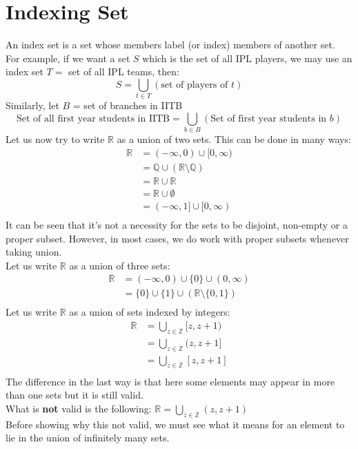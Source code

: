 \section{Indexing Set}\label{sec:indexset}
An index set is a set whose members label (or index) members of another set.\\
For example, if we want a set $S$ which is the set of all IPL players, we may use an index set $T=$ set of all IPL teams, then:
$$S = \bigcup_{t \in T}(\text{set of players of }t)$$
Similarly, let $B$ = set of branches in IITB
$$\text{Set of all first year students in IITB} = \bigcup_{b\in B}(\text{Set of first year students in }b)$$
Let us now try to write $\mathbb{R}$ as a union of two sets. This can be done in many ways:
\begin{align*}
    \mathbb{R} &= (-\infty, 0) \cup [0, \infty)\\
    &= \mathbb{Q} \cup (\mathbb{R}\setminus\mathbb{Q})\\
    &= \mathbb{R} \cup \mathbb{R}\\
    &= \mathbb{R} \cup \emptyset\\
    &= (-\infty, 1] \cup [0, \infty)\\
\end{align*}
It can be seen that it's not a necessity for the sets to be disjoint, non-empty or a proper subset. However, in most cases, we do work with proper subsets whenever taking union.\\
Let us write $\mathbb{R}$ as a union of three sets:
\begin{align*}
    \mathbb{R} &= (-\infty, 0) \cup \{0\} \cup (0, \infty)\\
    &= \{0\}\cup\{1\}\cup(\mathbb{R}\setminus\{0, 1\})\\
\end{align*}
Let us write $\mathbb{R}$ as a union of sets indexed by integers:
\begin{align*}
    \mathbb{R} &= \bigcup_{z\in\mathbb{Z}}[z, z+1)\\
    &= \bigcup_{z\in\mathbb{Z}}(z, z+1]\\
    &= \bigcup_{z\in\mathbb{Z}}[z, z+1]\\
\end{align*}
The difference in the last way is that here some elements may appear in more than one sets but it is still valid.\\
What is \textbf{not} valid is the following: $\mathbb{R} = \displaystyle\bigcup_{z\in\mathbb{Z}}(z, z+1)$\\
Before showing why this not valid, we must see what it means for an element to lie in the union of infinitely many sets.\\
